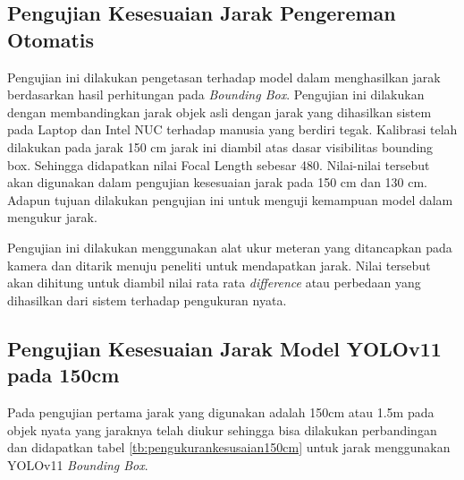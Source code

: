\subsection{Pengujian Kesesuaian Jarak Pengereman Otomatis}
Pengujian ini dilakukan pengetasan terhadap model dalam menghasilkan jarak berdasarkan hasil perhitungan pada \emph{Bounding Box}. Pengujian ini dilakukan dengan membandingkan jarak objek asli dengan jarak yang dihasilkan sistem pada Laptop dan Intel NUC terhadap manusia yang berdiri tegak. Kalibrasi telah dilakukan pada jarak 150 cm jarak ini diambil atas dasar visibilitas bounding box. Sehingga didapatkan nilai Focal Length sebesar 480. Nilai-nilai tersebut akan digunakan dalam pengujian kesesuaian jarak pada 150 cm dan 130 cm. Adapun tujuan dilakukan pengujian ini untuk menguji kemampuan model dalam mengukur jarak.

Pengujian ini dilakukan menggunakan alat ukur meteran yang ditancapkan pada kamera dan ditarik menuju peneliti untuk mendapatkan jarak. Nilai tersebut akan dihitung untuk diambil nilai rata rata \emph{difference} atau perbedaan yang dihasilkan dari sistem terhadap pengukuran nyata.

\subsection{Pengujian Kesesuaian Jarak Model YOLOv11 pada 150cm}

Pada pengujian pertama jarak yang digunakan adalah 150cm atau 1.5m pada objek nyata yang jaraknya telah diukur sehingga bisa dilakukan perbandingan dan didapatkan tabel \ref{tb:pengukurankesusaian150cm} untuk jarak menggunakan YOLOv11 \emph{Bounding Box}.

